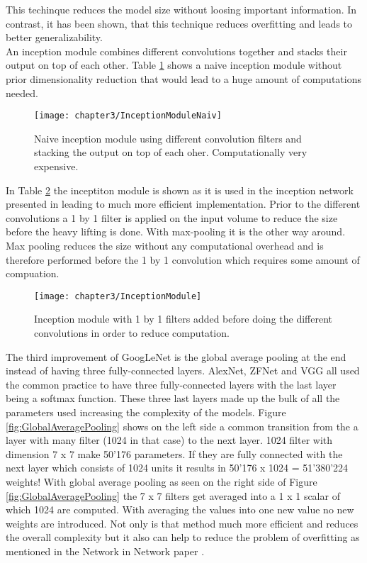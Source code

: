 This techinque reduces the model size without loosing important information. In contrast, it has been shown, that this technique reduces overfitting and leads to better generalizability.\\

An inception module combines different convolutions together and stacks their output on top of each other. Table \ref{fig:InceptionModuleNaiv} shows a naive inception module without prior dimensionality reduction that would lead to a huge amount of computations needed. 

\begin{figure}[H]
  \centering
  \caption{Naive inception module using different convolution filters and stacking the output on top of each oher. Computationally very expensive. \cite{ReviewGoogleLeNetv1}}
  \texttt{[image: chapter3/InceptionModuleNaiv]}
  \label{fig:InceptionModuleNaiv}
\end{figure}

In Table \ref{fig:InceptionModule} the inceptiton module is shown as it is used in the inception network presented in \cite{szegedy2015going} leading to much more efficient implementation. Prior to the different convolutions a 1 by 1 filter is applied on the input volume to reduce the size before the heavy lifting is done. With max-pooling it is the other way around. Max pooling reduces the size without any computational overhead and is therefore performed before the 1 by 1 convolution which requires some amount of compuation.

\begin{figure}[H]
  \centering
  \caption{Inception module with 1 by 1 filters added before doing the different convolutions in order to reduce computation. \cite{ReviewGoogleLeNetv1}}
  \texttt{[image: chapter3/InceptionModule]}
  \label{fig:InceptionModule}
\end{figure}

The third improvement of GoogLeNet is the global average pooling at the end instead of having three fully-connected layers. AlexNet, ZFNet and VGG all used the common practice to have three fully-connected layers with the last layer being a softmax function. These three last layers made up the bulk of all the parameters used increasing the complexity of the models. Figure \ref{fig:GlobalAveragePooling} shows on the left side a common transition from the a layer with many filter (1024 in that case) to the next layer. 1024 filter with dimension 7 x 7 make 50'176 parameters. If they are fully connected with the next layer which consists of 1024 units it results in 50'176 x 1024 = 51'380'224 weights! With global average pooling as seen on the right side of Figure \ref{fig:GlobalAveragePooling} the 7 x 7 filters get averaged into a 1 x 1 scalar of which 1024 are computed. With averaging the values into one new value no new weights are introduced. Not only is that method much more efficient and reduces the overall complexity but it also can help to reduce the problem of overfitting as mentioned in the Network in Network paper \cite{lin2013network}.

